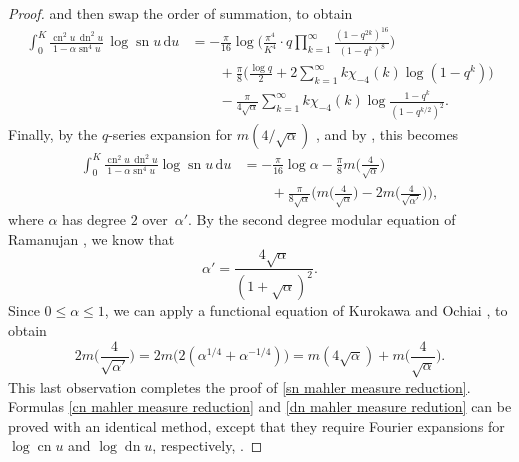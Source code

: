 \documentclass[12pt,reqno]{amsart}
\theoremstyle{remark}
\begin{document}
\begin{proof}
and then swap the order of summation, to obtain
\begin{equation*}
\begin{split}
\int_{0}^{K}\frac{{\operatorname{cn}}^2 u\,{\operatorname{dn}}^2u}{1-\alpha{\operatorname{sn}}^4u}\,\log{\operatorname{sn}} u\,{{\mathrm d}} u
&=-\frac{\pi}{16}\log\biggl(\frac{\pi^4}{K^4}\cdot q\prod_{k=1}^{\infty}\frac{(1-q^{2k})^{16}}{(1-q^k)^8}\biggr)
\\ &\qquad
+\frac{\pi}{8}\biggl(\frac{\log q}{2}+2\sum_{k=1}^{\infty}k\chi_{-4}(k)\log(1-q^k)\biggr)
\\ &\qquad
-\frac{\pi}{4\sqrt{\alpha}}\sum_{k=1}^{\infty}k\chi_{-4}(k)\log\frac{1-q^k}{(1-q^{k/2})^2}.
\end{split}
\end{equation*}
Finally, by the $q$-series expansion for
$m(4/\sqrt{\alpha})$ \cite[Entry (2-9)]{LR}, and by
\cite[pg.~124, Entries 12.2 and~12.3]{Be3}, this becomes
\begin{equation*}
\begin{split}
\int_{0}^{K}\frac{{\operatorname{cn}}^2u\,{\operatorname{dn}}^2u}{1-\alpha{\operatorname{sn}}^4u}\log{\operatorname{sn}} u\,{{\mathrm d}} u
&=-\frac{\pi}{16}\log\alpha-\frac{\pi}{8}m\biggl(\frac{4}{\sqrt{\alpha}}\biggr)
\\ &\qquad
+\frac{\pi}{8\sqrt{\alpha}}\biggl(m\biggl(\frac{4}{\sqrt{\alpha}}\biggr)-2m\biggl(\frac{4}{\sqrt{\alpha'}}\biggr)\biggr),
\end{split}
\end{equation*}
where $\alpha$ has degree $2$ over~$\alpha'$.  By the second degree
modular equation of Ramanujan \cite[pg.~215]{Be3}, we know that
\begin{equation*}
\alpha'=\frac{4\sqrt{\alpha}}{(1+\sqrt{\alpha})^2}.
\end{equation*}
Since $0\le \alpha\le 1$, we can apply a functional equation of
Kurokawa and Ochiai \cite{KO}, to obtain
\begin{equation*}
2m\biggl(\frac{4}{\sqrt{\alpha'}}\biggr)
=2m\bigl(2(\alpha^{1/4}+\alpha^{-1/4})\bigr)
=m(4\sqrt{\alpha})+m\biggl(\frac{4}{\sqrt{\alpha}}\biggr).
\end{equation*}
This last observation completes the proof of \eqref{sn mahler
measure reduction}.  Formulas \eqref{cn mahler measure reduction}
and \eqref{dn mahler measure redution} can be proved with an
identical method, except that they require Fourier expansions for
$\log{\operatorname{cn}} u$ and $\log{\operatorname{dn}} u$, respectively, \cite[pg.~917]{GR}.
\end{proof}
\end{document}

